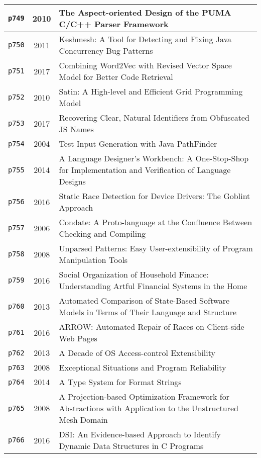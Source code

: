 \begin{longtable}{| c | c | p{16cm} |}
  \hline
  \texttt{p749} & 2010 & The Aspect-oriented Design of the PUMA C/C++ Parser Framework \\
  \hline
  \texttt{p750} & 2011 & Keshmesh: A Tool for Detecting and Fixing Java Concurrency Bug Patterns \\
  \hline
  \texttt{p751} & 2017 & Combining Word2Vec with Revised Vector Space Model for Better Code Retrieval \\
  \hline
  \texttt{p752} & 2010 & Satin: A High-level and Efficient Grid Programming Model \\
  \hline
  \texttt{p753} & 2017 & Recovering Clear, Natural Identifiers from Obfuscated JS Names \\
  \hline
  \texttt{p754} & 2004 & Test Input Generation with Java PathFinder \\
  \hline
  \texttt{p755} & 2014 & A Language Designer's Workbench: A One-Stop-Shop for Implementation and Verification of Language Designs \\
  \hline
  \texttt{p756} & 2016 & Static Race Detection for Device Drivers: The Goblint Approach \\
  \hline
  \texttt{p757} & 2006 & Condate: A Proto-language at the Confluence Between Checking and Compiling \\
  \hline
  \texttt{p758} & 2008 & Unparsed Patterns: Easy User-extensibility of Program Manipulation Tools \\
  \hline
  \texttt{p759} & 2016 & Social Organization of Household Finance: Understanding Artful Financial Systems in the Home \\
  \hline
  \texttt{p760} & 2013 & Automated Comparison of State-Based Software Models in Terms of Their Language and Structure \\
  \hline
  \texttt{p761} & 2016 & ARROW: Automated Repair of Races on Client-side Web Pages \\
  \hline
  \texttt{p762} & 2013 & A Decade of OS Access-control Extensibility \\
  \hline
  \texttt{p763} & 2008 & Exceptional Situations and Program Reliability \\
  \hline
  \texttt{p764} & 2014 & A Type System for Format Strings \\
  \hline
  \texttt{p765} & 2008 & A Projection-based Optimization Framework for Abstractions with Application to the Unstructured Mesh Domain \\
  \hline
  \texttt{p766} & 2016 & DSI: An Evidence-based Approach to Identify Dynamic Data Structures in C Programs \\

\end{longtable}
